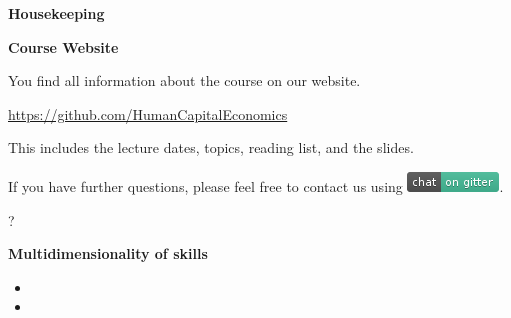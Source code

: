 \begin{frame}\begin{center}
	\LARGE\textbf{Housekeeping}
\end{center}\end{frame}
\begin{frame}
	\textbf{Course Website}\vspace{0.3cm}

You find all information about the course on our website.

\begin{center}
\url{https://github.com/HumanCapitalEconomics}
\end{center}

This includes the lecture dates, topics, reading list, and the slides.\vspace{0.3cm}

If you have further questions, please feel free to contact us using
\includegraphics[scale=0.5]{../../shared/fig-gitter}.

\end{frame}
\begin{frame}\begin{center}
{\fontsize{125}{60}\selectfont ?}
\end{center}\end{frame}
\begin{frame}
\textbf{Multidimensionality of skills}\vspace{0.3cm}

\begin{itemize}
\item {}
\item {}
\end{itemize}

\end{frame}
